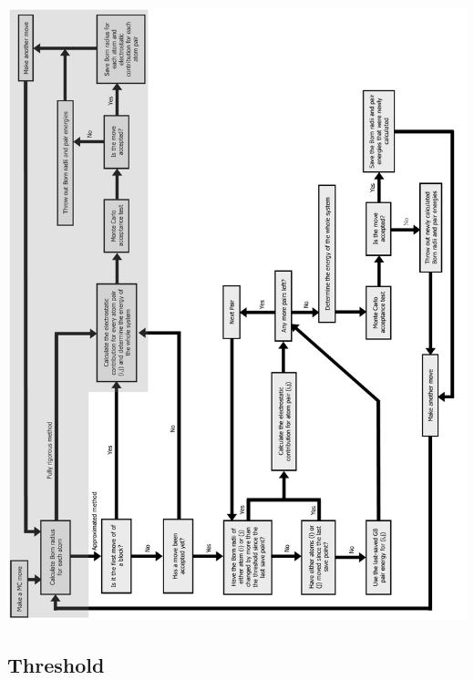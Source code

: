 \documentclass[10pt]{beamer}
\begin{document}
\begin{center}
\includegraphics[angle=270,scale=0.33]{figures/pdf/flow1.pdf}
\end{center}


\subsection{Threshold}

\end{document}
